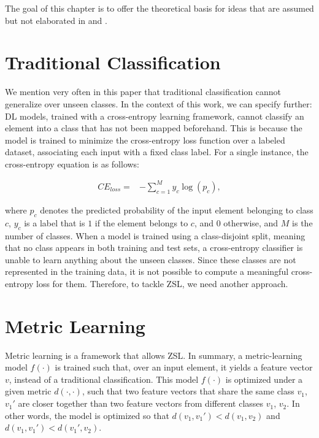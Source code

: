The goal of this chapter is to offer the theoretical basis for ideas that are assumed but not elaborated in  and .

\section{Traditional Classification}

We mention very often in this paper that traditional classification cannot generalize over unseen classes. In the context of this work, we can specify further: \gls{DL} models, trained with a cross-entropy learning framework, cannot classify an element into a class that has not been mapped beforehand. This is because the model is trained to minimize the cross-entropy loss function over a labeled dataset, associating each input with a fixed class label. For a single instance, the cross-entropy equation is as follows:

\begin{equation}
    \label{cross_entropy}
    \begin{split}
        CE_{loss} = & -\sum_{c=1}^My_{c}\log(p_{c}),
    \end{split}
\end{equation}

where $p_{c}$ denotes the predicted probability of the input element belonging to class $c$, $y_{c}$ is a label that is $1$ if the element belongs to $c$, and $0$ otherwise, and $M$ is the number of classes. When a model is trained using a class-disjoint split, meaning that no class appears in both training and test sets, a cross-entropy classifier is unable to learn anything about the unseen classes. Since these classes are not represented in the training data, it is not possible to compute a meaningful cross-entropy loss for them. Therefore, to tackle \gls{ZSL}, we need another approach.

\section{Metric Learning}

Metric learning is a framework that allows \gls{ZSL}. In summary, a metric-learning model  \( f(\cdot) \) is trained such that, over an input element, it yields a feature vector $v$, instead of a traditional classification. This model \( f(\cdot) \) is optimized under a given metric \( d(\cdot, \cdot) \), such that two feature vectors that share the same class $v_1$, $v_1'$ are closer together than two feature vectors from different classes $v_1$, $v_2$. In other words, the model is optimized so that $d(v_1, v_1') < d(v_1, v_2)$ and $d(v_1, v_1') < d(v_1', v_2)$.

